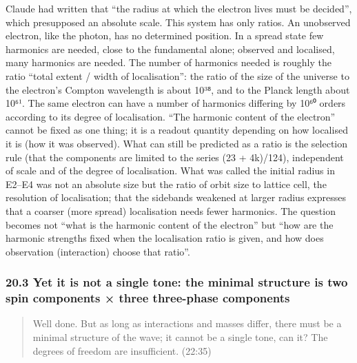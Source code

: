 \documentclass[
  a4paper,
]{article}
\begin{document}
Claude had written that ``the radius at which the electron lives must be
decided'', which presupposed an absolute scale. This system has only
ratios. An unobserved electron, like the photon, has no determined
position. In a spread state few harmonics are needed, close to the
fundamental alone; observed and localised, many harmonics are needed.
The number of harmonics needed is roughly the ratio ``total extent /
width of localisation'': the ratio of the size of the universe to the
electron's Compton wavelength is about 10³⁸, and to the Planck length
about 10⁶¹. The same electron can have a number of harmonics differing
by 10⁶⁰ orders according to its degree of localisation. ``The harmonic
content of the electron'' cannot be fixed as one thing; it is a readout
quantity depending on how localised it is (how it was observed). What
can still be predicted as a ratio is the selection rule (that the
components are limited to the series (23 + 4k)/124), independent of
scale and of the degree of localisation. What was called the initial
radius in E2--E4 was not an absolute size but the ratio of orbit size to
lattice cell, the resolution of localisation; that the sidebands
weakened at larger radius expresses that a coarser (more spread)
localisation needs fewer harmonics. The question becomes not ``what is
the harmonic content of the electron'' but ``how are the harmonic
strengths fixed when the localisation ratio is given, and how does
observation (interaction) choose that ratio''.

\subsubsection{20.3 Yet it is not a single tone: the minimal structure
is two spin components × three three-phase
components}\label{yet-it-is-not-a-single-tone-the-minimal-structure-is-two-spin-components-three-three-phase-components}

\begin{quote}
Well done. But as long as interactions and masses differ, there must be
a minimal structure of the wave; it cannot be a single tone, can it? The
degrees of freedom are insufficient. (22:35)
\end{quote}
\end{document}
